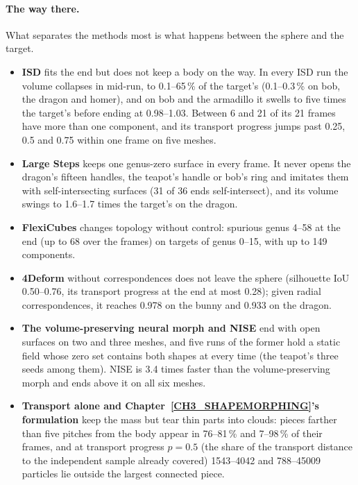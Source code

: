 \paragraph{The way there.} What separates the methods most is what happens between the sphere and the target.
\begin{itemize}
  \item \textbf{ISD} fits the end but does not keep a body on the way. In every ISD run the volume collapses in mid-run, to
        0.1--65\,\% of the target's (0.1--0.3\,\% on bob, the dragon and homer), and on bob and the armadillo it swells to
        five times the target's before ending at 0.98--1.03. Between 6 and 21 of its 21 frames have more than one
        component, and its transport progress jumps past 0.25, 0.5 and 0.75 within one frame on five meshes.
  \item \textbf{Large Steps} keeps one genus-zero surface in every frame. It never opens the dragon's fifteen handles, the
        teapot's handle or bob's ring and imitates them with self-intersecting surfaces (31 of 36 ends self-intersect),
        and its volume swings to 1.6--1.7 times the target's on the dragon.
  \item \textbf{FlexiCubes} changes topology without control: spurious genus 4--58 at the end (up to 68 over the frames)
        on targets of genus 0--15, with up to 149 components.
  \item \textbf{4Deform} without correspondences does not leave the sphere (silhouette IoU 0.50--0.76, its transport
        progress at the end at most 0.28); given radial correspondences, it reaches 0.978 on the bunny and 0.933 on the
        dragon.
  \item \textbf{The volume-preserving neural morph and NISE} end with open surfaces on two and three meshes, and five runs
        of the former hold a static field whose zero set contains both shapes at every time (the teapot's three seeds
        among them). NISE is 3.4 times faster than the volume-preserving morph and ends above it on all six meshes.
  \item \textbf{Transport alone and Chapter~\ref{CH3_SHAPEMORPHING}'s formulation} keep the mass but tear thin parts into
        clouds: pieces farther than five pitches from the body appear in 76--81\,\% and 7--98\,\% of their frames, and
        at transport progress $p=0.5$ (the share of the transport distance to the independent sample already covered)
        1543--4042 and 788--45009 particles lie outside the largest connected piece.
\end{itemize}
